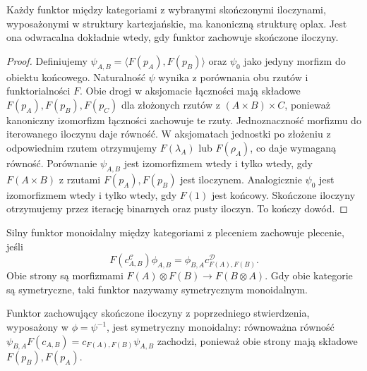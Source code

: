 \begin{stwierdzenie}\label{cat:prop:cartesian-oplax}
Każdy funktor między kategoriami z wybranymi skończonymi iloczynami, wyposażonymi w struktury kartezjańskie, ma kanoniczną strukturę oplax. Jest ona odwracalna dokładnie wtedy, gdy funktor zachowuje skończone iloczyny.
\end{stwierdzenie}
\begin{proof}
Definiujemy $\psi_{A,B}=\langle F(p_A),F(p_B)\rangle$ oraz $\psi_0$ jako jedyny morfizm do obiektu końcowego. Naturalność $\psi$ wynika z porównania obu rzutów i funktorialności $F$. Obie drogi w aksjomacie łączności mają składowe $F(p_A),F(p_B),F(p_C)$ dla złożonych rzutów z $(A\times B)\times C$, ponieważ kanoniczny izomorfizm łączności zachowuje te rzuty. Jednoznaczność morfizmu do iterowanego iloczynu daje równość. W aksjomatach jednostki po złożeniu z odpowiednim rzutem otrzymujemy $F(\lambda_A)$ lub $F(\rho_A)$, co daje wymaganą równość. Porównanie $\psi_{A,B}$ jest izomorfizmem wtedy i tylko wtedy, gdy $F(A\times B)$ z rzutami $F(p_A),F(p_B)$ jest iloczynem. Analogicznie $\psi_0$ jest izomorfizmem wtedy i tylko wtedy, gdy $F(1)$ jest końcowy. Skończone iloczyny otrzymujemy przez iterację binarnych oraz pusty iloczyn. To kończy dowód.
\end{proof}

\begin{definicja}\label{cat:def:braided-functor}
Silny funktor monoidalny między kategoriami z pleceniem zachowuje plecenie, jeśli
\[
F(c^{\mathcal C}_{A,B})\phi_{A,B}
=\phi_{B,A}c^{\mathcal D}_{F(A),F(B)}.
\]
Obie strony są morfizmami $F(A)\otimes F(B)\to F(B\otimes A)$. Gdy obie kategorie są symetryczne, taki funktor nazywamy symetrycznym monoidalnym.
\end{definicja}

\begin{przyklad}
Funktor zachowujący skończone iloczyny z poprzedniego stwierdzenia, wyposażony w $\phi=\psi^{-1}$, jest symetryczny monoidalny: równoważna równość $\psi_{B,A}F(c_{A,B})=c_{F(A),F(B)}\psi_{A,B}$ zachodzi, ponieważ obie strony mają składowe $F(p_B),F(p_A)$.
\end{przyklad}

